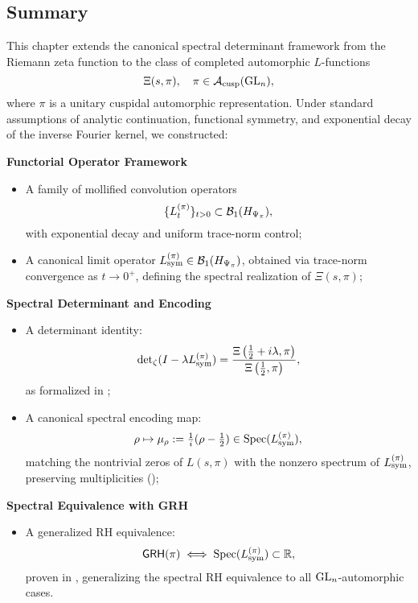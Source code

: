 \subsection*{Summary}

This chapter extends the canonical spectral determinant framework from the Riemann zeta function to the class of completed automorphic \( L \)-functions
\[
\Xi(s, \pi), \quad \pi \in \mathcal{A}_{\mathrm{cusp}}(\mathrm{GL}_n),
\]
where \( \pi \) is a unitary cuspidal automorphic representation. Under standard assumptions of analytic continuation, functional symmetry, and exponential decay of the inverse Fourier kernel, we constructed:

\textbf{Functorial Operator Framework}
\begin{itemize}
  \item A family of mollified convolution operators
  \[
  \{ L_t^{(\pi)} \}_{t > 0} \subset \mathcal{B}_1(H_{\Psi_{\pi}}),
  \]
  with exponential decay and uniform trace-norm control;

  \item A canonical limit operator \( {L_{\mathrm{sym}}^{(\pi)}} \in \mathcal{B}_1(H_{\Psi_{\pi}}) \), obtained via trace-norm convergence as \( t \to 0^+ \), defining the spectral realization of \( \Xi(s, \pi) \);
\end{itemize}

\textbf{Spectral Determinant and Encoding}
\begin{itemize}
  \item A determinant identity:
  \[
  \det\nolimits_{\zeta}(I - \lambda {L_{\mathrm{sym}}^{(\pi)}}) = \frac{\Xi\left(\tfrac{1}{2} + i\lambda, \pi\right)}{\Xi\left(\tfrac{1}{2}, \pi\right)},
  \]
  as formalized in ;

  \item A canonical spectral encoding map:
  \[
  \rho \mapsto \mu_\rho := \tfrac{1}{i}(\rho - \tfrac{1}{2}) \in \operatorname{Spec}({L_{\mathrm{sym}}^{(\pi)}}),
  \]
  matching the nontrivial zeros of \( L(s, \pi) \) with the nonzero spectrum of \( {L_{\mathrm{sym}}^{(\pi)}} \), preserving multiplicities ();
\end{itemize}

\textbf{Spectral Equivalence with GRH}
\begin{itemize}
  \item A generalized RH equivalence:
  \[
  \mathsf{GRH}(\pi) \iff \operatorname{Spec}({L_{\mathrm{sym}}^{(\pi)}}) \subset \mathbb{R},
  \]
  proven in , generalizing the spectral RH equivalence to all \( \mathrm{GL}_n \)-automorphic cases.
\end{itemize}

